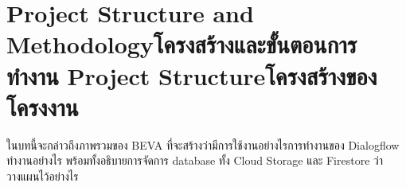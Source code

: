 \chapter{\ifproject%
    \ifenglish Project Structure and Methodology\else โครงสร้างและขั้นตอนการทำงาน\fi
  \else%
    \ifenglish Project Structure\else โครงสร้างของโครงงาน\fi
  \fi
 }

ในบทนี้จะกล่าวถึงภาพรวมของ BEVA ที่จะสร้างว่ามีการใช้งานอย่างไรการทำงานของ Dialogflow ทำงานอย่างไร
พร้อมทั้งอธิบายการจัดการ database ทั้ง Cloud Storage และ Firestore ว่าวางแผนไว้อย่างไร

\makeatletter


\makeatother

